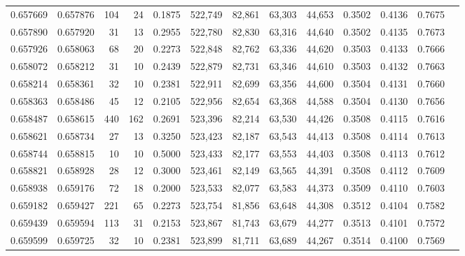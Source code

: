 \begin{tabular}{rrrrrrrrrrrrr}
0.657669 & 0.657876 &   104 &  24 &                                     0.1875 & 522,749 &  82,861 &  63,303 &  44,653 & 0.3502 & 0.4136 & 0.7675 \\
0.657890 & 0.657920 &    31 &  13 &                                     0.2955 & 522,780 &  82,830 &  63,316 &  44,640 & 0.3502 & 0.4135 & 0.7673 \\
0.657926 & 0.658063 &    68 &  20 &                                     0.2273 & 522,848 &  82,762 &  63,336 &  44,620 & 0.3503 & 0.4133 & 0.7666 \\
0.658072 & 0.658212 &    31 &  10 &                                     0.2439 & 522,879 &  82,731 &  63,346 &  44,610 & 0.3503 & 0.4132 & 0.7663 \\
0.658214 & 0.658361 &    32 &  10 &                                     0.2381 & 522,911 &  82,699 &  63,356 &  44,600 & 0.3504 & 0.4131 & 0.7660 \\
0.658363 & 0.658486 &    45 &  12 &                                     0.2105 & 522,956 &  82,654 &  63,368 &  44,588 & 0.3504 & 0.4130 & 0.7656 \\
0.658487 & 0.658615 &   440 & 162 &                                     0.2691 & 523,396 &  82,214 &  63,530 &  44,426 & 0.3508 & 0.4115 & 0.7616 \\
0.658621 & 0.658734 &    27 &  13 &                                     0.3250 & 523,423 &  82,187 &  63,543 &  44,413 & 0.3508 & 0.4114 & 0.7613 \\
0.658744 & 0.658815 &    10 &  10 &                                     0.5000 & 523,433 &  82,177 &  63,553 &  44,403 & 0.3508 & 0.4113 & 0.7612 \\
0.658821 & 0.658928 &    28 &  12 &                                     0.3000 & 523,461 &  82,149 &  63,565 &  44,391 & 0.3508 & 0.4112 & 0.7609 \\
0.658938 & 0.659176 &    72 &  18 &                                     0.2000 & 523,533 &  82,077 &  63,583 &  44,373 & 0.3509 & 0.4110 & 0.7603 \\
0.659182 & 0.659427 &   221 &  65 &                                     0.2273 & 523,754 &  81,856 &  63,648 &  44,308 & 0.3512 & 0.4104 & 0.7582 \\
0.659439 & 0.659594 &   113 &  31 &                                     0.2153 & 523,867 &  81,743 &  63,679 &  44,277 & 0.3513 & 0.4101 & 0.7572 \\
0.659599 & 0.659725 &    32 &  10 &                                     0.2381 & 523,899 &  81,711 &  63,689 &  44,267 & 0.3514 & 0.4100 & 0.7569 \\

\end{tabular}
